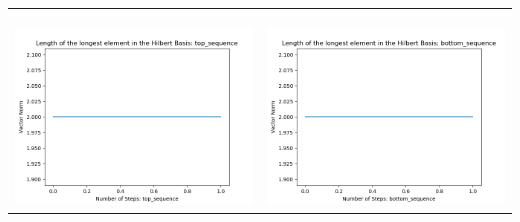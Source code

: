 \documentclass[10pt]{article}
\begin{document}
\begin{tabular}{c|c}
\begin{minipage}{.45\textwidth}
\end{minipage} \\ \\
\hline \\\begin{minipage}{.45\textwidth}
\includegraphics[width=\textwidth]{"DATA/5d/5 generators 1 bound J/top_sequence LENGTH"}
\end{minipage} &
\begin{minipage}{.45\textwidth}
\includegraphics[width=\textwidth]{"DATA/5d/5 generators 1 bound J bottomup/bottom_sequence LENGTH"}
\end{minipage}
\end{tabular}
\end{document}
